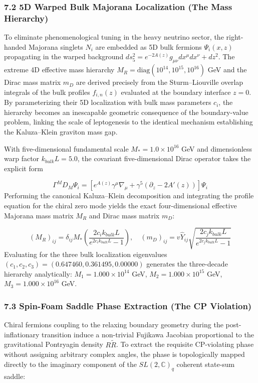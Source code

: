 \documentclass[aps,prd,onecolumn,superscriptaddress,nofootinbib,longbibliography,10pt]{revtex4-2}
\begin{document}
\subsubsection*{7.2 5D Warped Bulk Majorana Localization (The Mass Hierarchy)}

To eliminate phenomenological tuning in the heavy neutrino sector, the right-handed Majorana singlets \(N_i\) are embedded as 5D bulk fermions \(\Psi_i(x,z)\) propagating in the warped background \(ds_5^2 = e^{-2A(z)}g_{\mu\nu}dx^\mu dx^\nu + dz^2\). The extreme 4D effective mass hierarchy \(M_R = \text{diag}(10^{14}, 10^{15}, 10^{16})\) GeV and the Dirac mass matrix \(m_D\) are derived precisely from the Sturm--Liouville overlap integrals of the bulk profiles \(f_{i,n}(z)\) evaluated at the boundary interface \(z=0\). By parameterizing their 5D localization with bulk mass parameters \(c_i\), the hierarchy becomes an inescapable geometric consequence of the boundary-value problem, linking the scale of leptogenesis to the identical mechanism establishing the Kaluza--Klein graviton mass gap.


With five-dimensional fundamental scale \(M_* = 1.0 \times 10^{16}\) GeV and dimensionless warp factor \(k_{bulk}L = 5.0\), the covariant five-dimensional Dirac operator takes the explicit form


\[\Gamma^M D_M \Psi_i = \left[ e^{A(z)}\gamma^\mu \nabla_\mu + \gamma^5 (\partial_z - 2A'(z)) \right] \Psi_i\]
Performing the canonical Kaluza--Klein decomposition and integrating the profile equation for the chiral zero mode yields the exact four-dimensional effective Majorana mass matrix \(M_R\) and Dirac mass matrix \(m_D\):


\[(M_R)_{ij} = \delta_{ij} M_* \left( \frac{2c_i k_{bulk} L}{e^{2c_i k_{bulk} L} - 1} \right), \quad (m_D)_{ij} = v \hat{Y}_{ij} \sqrt{ \frac{2c_j k_{bulk} L}{e^{2c_j k_{bulk} L} - 1} }\]
Evaluating for the three bulk localization eigenvalues \((c_1, c_2, c_3) = (0.647460, 0.361495, 0.00000)\) generates the three-decade hierarchy analytically: \(M_1 = 1.000 \times 10^{14}\) GeV, \(M_2 = 1.000 \times 10^{15}\) GeV, \(M_3 = 1.000 \times 10^{16}\) GeV.




\subsubsection*{7.3 Spin-Foam Saddle Phase Extraction (The CP Violation)}

Chiral fermions coupling to the relaxing boundary geometry during the post-inflationary transition induce a non-trivial Fujikawa Jacobian proportional to the gravitational Pontryagin density \(R\tilde{R}\). To extract the requisite CP-violating phase without assigning arbitrary complex angles, the phase is topologically mapped directly to the imaginary component of the \(SL(2,\mathbb{C})_q\) coherent state-sum saddle:
\end{document}
